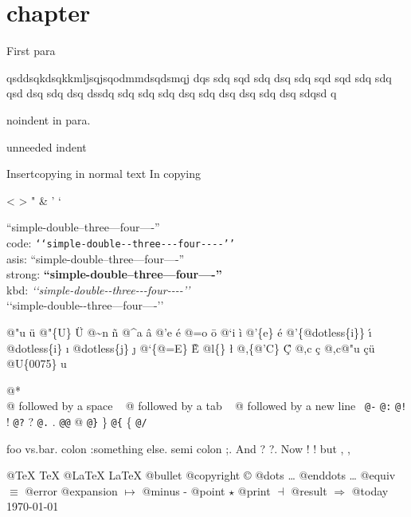 \documentclass{book}
\begin{document}
\label{anchor:Top}%
\chapter{{chapter}}
\label{anchor:chapter}%

First para

\noindent{}qsddsqkdsqkkmljsqjsqodmmdsqdsmqj dqs sdq sqd sdq dsq sdq sqd sqd sdq sdq 
qsd dsq sdq dsq dssdq sdq sdq sdq dsq sdq dsq dsq sdq dsq sdqsd q

\noindent{}noindent in para.

unneeded indent

Insertcopying in normal text
In copying

<
>
"
\&
'
`

``simple-double--three---four----''\leavevmode{}\\
code: \texttt{{`}{`}simple-double{-}{-}three{-}{-}{-}four{-}{-}{-}-{'}{'}} \leavevmode{}\\
asis: ``simple-double--three---four----'' \leavevmode{}\\
strong: \textbf{``simple-double--three---four----''} \leavevmode{}\\
kbd: {\ttfamily\textsl{{`}{`}simple-double{-}{-}three{-}{-}{-}four{-}{-}{-}-{'}{'}}} \leavevmode{}\\

`\hbox{}`simple-double-\hbox{}-three---four----'\hbox{}'\leavevmode{}\\

%
%
%
%

@"u \"{u} 
@"\{U\} \"{U} 
@\~{}n \~{n}
@\^{}a \^{a}
@'e \'{e}
@=o \={o}
@`i \`{i}
@'\{e\} \'{e}
@'\{@dotless\{i\}\} \'{\i{}} 
@dotless\{i\} \i{}
@dotless\{j\} \j{}
@`\{@=E\} \`{\={E}} 
@l\{\} \l{}
@,\{@'C\} \c{\'{C}}
@,c \c{c}
@,c@"u \c{c}\"{u} \leavevmode{}\\

@U\{0075\} u

@* \leavevmode{}\\
@ followed by a space
\ {}
@ followed by a tab
\ {}
@ followed by a new line
\ {}\texttt{@-} \-{}
\texttt{@:} \@
\texttt{@!} \@!
\texttt{@?} \@?
\texttt{@.} \@.
\texttt{@@} @
\texttt{@\}} \}
\texttt{@\{} \{
\texttt{@/} 

foo vs.\@ bar. 
colon :\@And something else.
semi colon ;\@.
And ? ?\@.
Now ! !\@@
but , ,\@

@TeX \TeX{}
@LaTeX \LaTeX{}
@bullet \textbullet{}
@copyright \copyright{}
@dots \dots{}\@
@enddots \dots{}
@equiv $\equiv{}$
@error 
@expansion $\mapsto{}$
@minus -
@point $\star{}$
@print $\dashv{}$
@result $\Rightarrow{}$
@today \today{}
\end{document}
